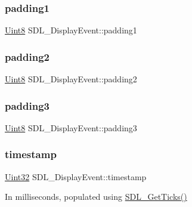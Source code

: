 \subsubsection{\texorpdfstring{padding1}{padding1}}
{\footnotesize\ttfamily \mbox{\hyperlink{_s_d_l__stdinc_8h_a2944638813a090aa23e62f4da842c3e2}{Uint8}} S\+D\+L\+\_\+\+Display\+Event\+::padding1}

\mbox{\label{struct_s_d_l___display_event_afe4ffe1364f1a29457636c8b74c7a3ce}} 
\subsubsection{\texorpdfstring{padding2}{padding2}}
{\footnotesize\ttfamily \mbox{\hyperlink{_s_d_l__stdinc_8h_a2944638813a090aa23e62f4da842c3e2}{Uint8}} S\+D\+L\+\_\+\+Display\+Event\+::padding2}

\mbox{\label{struct_s_d_l___display_event_aa4de9fba8f58fedb949894741ab0552b}} 
\subsubsection{\texorpdfstring{padding3}{padding3}}
{\footnotesize\ttfamily \mbox{\hyperlink{_s_d_l__stdinc_8h_a2944638813a090aa23e62f4da842c3e2}{Uint8}} S\+D\+L\+\_\+\+Display\+Event\+::padding3}

\mbox{\label{struct_s_d_l___display_event_a6c4cd9f63a2ff62032602193c9bf605d}} 
\subsubsection{\texorpdfstring{timestamp}{timestamp}}
{\footnotesize\ttfamily \mbox{\hyperlink{_s_d_l__stdinc_8h_add440eff171ea5f55cb00c4a9ab8672d}{Uint32}} S\+D\+L\+\_\+\+Display\+Event\+::timestamp}

In milliseconds, populated using \mbox{\hyperlink{_s_d_l__timer_8h_a0b9bc71d6287e0ffafdc3419760fe2b3}{S\+D\+L\+\_\+\+Get\+Ticks()}} \mbox{\label{struct_s_d_l___display_event_a5f4993ce9c5289a2ac046ae7a6dff544}} 
